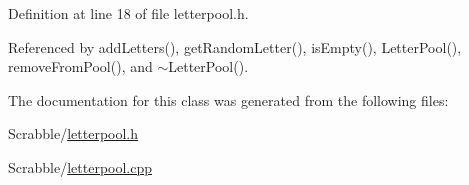Definition at line 18 of file letterpool.\-h.



Referenced by add\-Letters(), get\-Random\-Letter(), is\-Empty(), Letter\-Pool(), remove\-From\-Pool(), and $\sim$\-Letter\-Pool().



The documentation for this class was generated from the following files\-:\begin{DoxyCompactItemize}
\item 
Scrabble/\hyperlink{letterpool_8h}{letterpool.\-h}\item 
Scrabble/\hyperlink{letterpool_8cpp}{letterpool.\-cpp}\end{DoxyCompactItemize}
